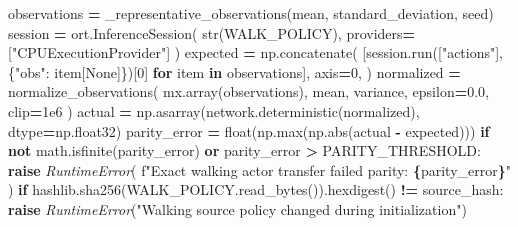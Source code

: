 \documentclass[
  chinese,
  11pt,
  letterpaper,
]{article}
\newenvironment{Shaded}{\begin{snugshade}}{\end{snugshade}}
\newcommand{\BuiltInTok}[1]{#1}
\newcommand{\ControlFlowTok}[1]{\textcolor[rgb]{0.13,0.29,0.53}{\textbf{#1}}}
\newcommand{\DecValTok}[1]{\textcolor[rgb]{0.00,0.00,0.81}{#1}}
\newcommand{\FloatTok}[1]{\textcolor[rgb]{0.00,0.00,0.81}{#1}}
\newcommand{\KeywordTok}[1]{\textcolor[rgb]{0.13,0.29,0.53}{\textbf{#1}}}
\newcommand{\NormalTok}[1]{#1}
\newcommand{\OperatorTok}[1]{\textcolor[rgb]{0.81,0.36,0.00}{\textbf{#1}}}
\newcommand{\PreprocessorTok}[1]{\textcolor[rgb]{0.56,0.35,0.01}{\textit{#1}}}
\newcommand{\SpecialCharTok}[1]{\textcolor[rgb]{0.81,0.36,0.00}{\textbf{#1}}}
\newcommand{\SpecialStringTok}[1]{\textcolor[rgb]{0.31,0.60,0.02}{#1}}
\newcommand{\StringTok}[1]{\textcolor[rgb]{0.31,0.60,0.02}{#1}}
\newcommand{\VariableTok}[1]{\textcolor[rgb]{0.00,0.00,0.00}{#1}}
\renewenvironment{Shaded}{\par\smallskip}{\par\smallskip}
\begin{document}
\begin{Shaded}
\begin{Highlighting}[]
\NormalTok{    observations }\OperatorTok{=}\NormalTok{ \_representative\_observations(mean, standard\_deviation, seed)}
\NormalTok{    session }\OperatorTok{=}\NormalTok{ ort.InferenceSession(}
        \BuiltInTok{str}\NormalTok{(WALK\_POLICY), providers}\OperatorTok{=}\NormalTok{[}\StringTok{"CPUExecutionProvider"}\NormalTok{]}
\NormalTok{    )}
\NormalTok{    expected }\OperatorTok{=}\NormalTok{ np.concatenate(}
\NormalTok{        [session.run([}\StringTok{"actions"}\NormalTok{], \{}\StringTok{"obs"}\NormalTok{: item[}\VariableTok{None}\NormalTok{]\})[}\DecValTok{0}\NormalTok{] }\ControlFlowTok{for}\NormalTok{ item }\KeywordTok{in}\NormalTok{ observations],}
\NormalTok{        axis}\OperatorTok{=}\DecValTok{0}\NormalTok{,}
\NormalTok{    )}
\NormalTok{    normalized }\OperatorTok{=}\NormalTok{ normalize\_observations(}
\NormalTok{        mx.array(observations), mean, variance, epsilon}\OperatorTok{=}\FloatTok{0.0}\NormalTok{, clip}\OperatorTok{=}\FloatTok{1e6}
\NormalTok{    )}
\NormalTok{    actual }\OperatorTok{=}\NormalTok{ np.asarray(network.deterministic(normalized), dtype}\OperatorTok{=}\NormalTok{np.float32)}
\NormalTok{    parity\_error }\OperatorTok{=} \BuiltInTok{float}\NormalTok{(np.}\BuiltInTok{max}\NormalTok{(np.}\BuiltInTok{abs}\NormalTok{(actual }\OperatorTok{{-}}\NormalTok{ expected)))}
    \ControlFlowTok{if} \KeywordTok{not}\NormalTok{ math.isfinite(parity\_error) }\KeywordTok{or}\NormalTok{ parity\_error }\OperatorTok{\textgreater{}}\NormalTok{ PARITY\_THRESHOLD:}
        \ControlFlowTok{raise} \PreprocessorTok{RuntimeError}\NormalTok{(}
            \SpecialStringTok{f"Exact walking actor transfer failed parity: }\SpecialCharTok{\{}\NormalTok{parity\_error}\SpecialCharTok{\}}\SpecialStringTok{"}
\NormalTok{        )}
    \ControlFlowTok{if}\NormalTok{ hashlib.sha256(WALK\_POLICY.read\_bytes()).hexdigest() }\OperatorTok{!=}\NormalTok{ source\_hash:}
        \ControlFlowTok{raise} \PreprocessorTok{RuntimeError}\NormalTok{(}\StringTok{"Walking source policy changed during initialization"}\NormalTok{)}


\end{Highlighting}
\end{Shaded}
\end{document}

